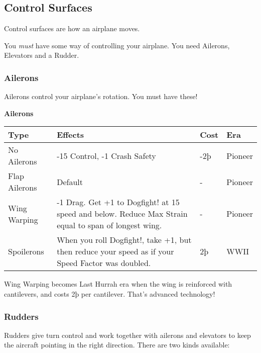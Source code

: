\documentclass{article}
\begin{document}
\subsection{Control Surfaces}
\label{_Control_Surfaces}

Control surfaces are how an airplane moves.

You \emph{must }have some way of controlling your airplane. You need
Ailerons, Elevators and a Rudder.

\subsubsection{Ailerons}
\label{_Ailerons}

Ailerons control your airplane's rotation. You must have these!

\textbf{Ailerons}

\begin{tabular}{|l|l|l|l|}
  \hline
  Type                                             & Effects                                                & Cost    & Era     \\\hline
  No Ailerons                                      & -15 Control, -1 Crash Safety                           & -2þ     & Pioneer \\\hline
  Flap Ailerons                                    & Default                                                & -       & Pioneer \\\hline
  Wing Warping                                     & -1 Drag. Get +1 to Dogfight! at 15 speed and below.
  Reduce Max Strain equal to span of longest wing. & -                                                      & Pioneer           \\\hline
  Spoilerons                                       & When you roll Dogfight!, take +1, but then reduce your
  speed as if your Speed Factor was doubled.       & 2þ                                                     & WWII              \\\hline
\end{tabular}

Wing Warping becomes Last Hurrah era when the wing is reinforced
with cantilevers, and costs 2þ per cantilever. That's advanced
technology!

\subsubsection{Rudders}
\label{_Rudders}

Rudders give turn control and work together with ailerons and elevators
to keep the aircraft pointing in the right direction. There are two
kinds available:
\end{document}
